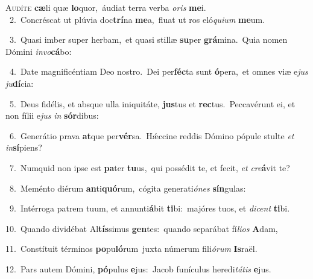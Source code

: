 \lettrine{\initial\textcolor{\initialcolor}{A}}{udíte} \textbf{cæ}\-li quæ \textbf{lo}\-quor,~\star áudiat terra verba \textit{o}\-\textit{ris} \textbf{me}\-i.\\
{\numbfont\textcolor{\numbcolor}{~2.}}~Concréscat ut plúvia doc\-\textbf{trí}\-na \textbf{me}\-a,~\star fluat ut ros eló\-\textit{qui}\-\textit{um} \textbf{me}\-um.\par
{\numbfont\textcolor{\numbcolor}{~3.}}~Quasi imber super herbam,~\dagger et quasi stillæ \textbf{su}\-per \textbf{grá}\-mina.~\star Quia nomen Dómini \textit{in}\-\textit{vo}\textbf{cá}bo:\par
{\numbfont\textcolor{\numbcolor}{~4.}}~Date magnificéntiam Deo nostro.~\dagger Dei per\-\textbf{féc}\-ta sunt \textbf{ó}\-pera,~\star et omnes viæ e\textit{jus} \textit{ju}\-\textbf{dí}cia:\par
{\numbfont\textcolor{\numbcolor}{~5.}}~Deus fidélis, et absque ulla iniquitáte, \textbf{jus}\-tus et \textbf{rec}\-tus.~\star Peccavérunt ei, et non fílii e\textit{jus} \textit{in} \textbf{sór}\-dibus:\par
{\numbfont\textcolor{\numbcolor}{~6.}}~Generátio prava \textbf{at}\-que per\-\textbf{vér}\-sa.~\star Hǽccine reddis Dómino pópule stulte \textit{et} \textit{in}\-\textbf{sí}piens?\par
{\numbfont\textcolor{\numbcolor}{~7.}}~Numquid non ipse est \textbf{pa}\-ter \textbf{tu}\-us,~\star qui possédit te, et fecit, \textit{et} \textit{cre}\-\textbf{á}vit te?\par
{\numbfont\textcolor{\numbcolor}{~8.}}~Meménto diérum \textbf{an}\-ti\-\textbf{quó}\-rum,~\star cógita generati\-\textit{ó}\-\textit{nes} \textbf{sín}\-gulas:\par
{\numbfont\textcolor{\numbcolor}{~9.}}~Intérroga patrem tuum, et annunti\-\textbf{á}\-bit \textbf{ti}\-bi:~\star majóres tuos, et \textit{di}\-\textit{cent} \textbf{ti}\-bi.\par
{\numbfont\textcolor{\numbcolor}{10.}}~Quando dividébat Al\-\textbf{tís}\-simus \textbf{gen}\-tes:~\star quando separábat fí\-\textit{li}\-\textit{os} \textbf{A}\-dam,\par
{\numbfont\textcolor{\numbcolor}{11.}}~Constítuit términos \textbf{po}\-pu\-\textbf{ló}\-rum~\star juxta númerum fili\-\textit{ó}\-\textit{rum} \textbf{Is}\-raël.\par
{\numbfont\textcolor{\numbcolor}{12.}}~Pars autem Dómini, \textbf{pó}\-pulus \textbf{e}\-jus:~\star Jacob funículus heredi\-\textit{tá}\-\textit{tis} \textbf{e}\-jus.\par
